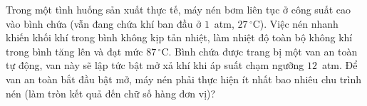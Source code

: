 	\begin{ex}%
		\label{HaTinh-SoGD-Lan1-III2}
		Trong một tình huống sản xuất thực tế, máy nén bơm liên tục ở công suất cao vào bình chứa (vẫn đang chứa khí ban đầu ở $1$~atm, $27\,^\circ\text{C}$). Việc nén nhanh khiến khối khí trong bình không kịp tản nhiệt, làm nhiệt độ toàn bộ không khí trong bình tăng lên và đạt mức $87\,^\circ\text{C}$. Bình chứa được trang bị một van an toàn tự động, van này sẽ lập tức bật mở xả khí khi áp suất chạm ngưỡng $12$~atm. Để van an toàn bắt đầu bật mở, máy nén phải thực hiện ít nhất bao nhiêu chu trình nén (làm tròn kết quả đến chữ số hàng đơn vị)?
		\par
	\end{ex}

